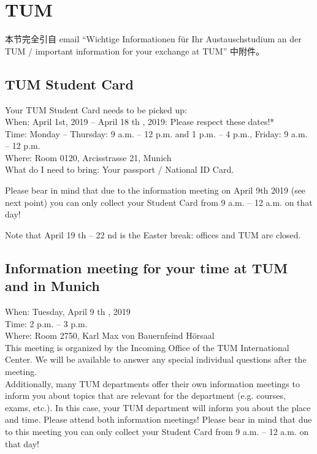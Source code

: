 \section{TUM}
本节完全引自 email ``Wichtige Informationen für Ihr Austauschstudium an der TUM / important information for your exchange at TUM'' 中附件。

\subsection{TUM Student Card}
Your TUM Student Card needs to be picked up: \\
When: April 1st, 2019 -- April 18 th , 2019: Please respect these dates!* \\
Time: Monday -- Thursday: 9 a.m. -- 12 p.m. and 1 p.m. -- 4 p.m., Friday: 9 a.m. -- 12 p.m. \\
Where: Room 0120, Arcisstrasse 21, Munich \\
What do I need to bring: Your passport / National ID Card.

Please bear in mind that due to the information meeting on April 9th 2019 (see next point) you can only collect your Student Card from 9 a.m. -- 12 a.m. on that day!

Note that April 19 th – 22 nd is the Easter break: offices and TUM are closed.


\subsection{Information meeting for your time at TUM and in Munich}
When: Tuesday, April 9 th , 2019 \\
Time: 2 p.m. -- 3 p.m. \\
Where: Room 2750, Karl Max von Bauernfeind Hörsaal \\
This meeting is organized by the Incoming Office of the TUM International Center. We will be available to
answer any special individual questions after the meeting. \\
Additionally, many TUM departments offer their own information meetings to inform you about topics that
are relevant for the department (e.g. courses, exams, etc.). In this case, your TUM department will inform
you about the place and time. Please attend both information meetings!
Please bear in mind that due to this meeting you can only collect your Student Card from
9 a.m. -- 12 a.m. on that day!


